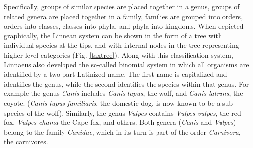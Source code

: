 \documentclass[11pt,a4paper]{book}
\newcommand{\e}{\emph}
\begin{document}
Specifically, groups of similar species are placed together in a genus, groups of related genera are
placed together in a family, families are grouped into orders, orders into classes, classes into phyla, and phyla into kingdoms. When depicted graphically, the Linnean system can be shown in the form of a tree with individual species at the tips, and with internal nodes in the tree representing higher-level categories (Fig. \ref{taxtree}). Along with this classification system, Linnaeus also developed the so-called binomial system 
in which all organisms are identified by a two-part Latinized name. The first name is capitalized and identifies the genus, while the second identifies the species within that genus. For example the genus \emph{Canis} includes \emph{Canis lupus}, the wolf, and \emph{Canis latrans}, the coyote. (\emph{Canis lupus familiaris}, the domestic dog, is now known to be a sub-species of the wolf). Similarly, the genus \emph{Vulpes} contains \emph{Vulpes vulpes}, the red fox, \emph{Vulpes chama} the Cape fox, and others. Both genera (\e{Canis} and \e{Vulpes}) belong to the family \emph{Canidae}, which in its turn is part of the order \emph{Carnivora}, the carnivores. 
\end{document}
